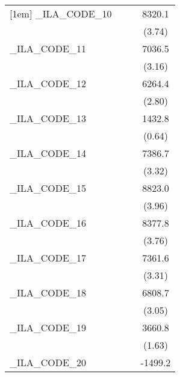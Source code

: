 {\begin{tabular}{l*{3}{c}}
[1em]
\_ILA\_CODE\_10&                     &                     &      8320.1\sym{***}\\
            &                     &                     &      (3.74)         \\
[1em]
\_ILA\_CODE\_11&                     &                     &      7036.5\sym{**} \\
            &                     &                     &      (3.16)         \\
[1em]
\_ILA\_CODE\_12&                     &                     &      6264.4\sym{**} \\
            &                     &                     &      (2.80)         \\
[1em]
\_ILA\_CODE\_13&                     &                     &      1432.8         \\
            &                     &                     &      (0.64)         \\
[1em]
\_ILA\_CODE\_14&                     &                     &      7386.7\sym{***}\\
            &                     &                     &      (3.32)         \\
[1em]
\_ILA\_CODE\_15&                     &                     &      8823.0\sym{***}\\
            &                     &                     &      (3.96)         \\
[1em]
\_ILA\_CODE\_16&                     &                     &      8377.8\sym{***}\\
            &                     &                     &      (3.76)         \\
[1em]
\_ILA\_CODE\_17&                     &                     &      7361.6\sym{***}\\
            &                     &                     &      (3.31)         \\
[1em]
\_ILA\_CODE\_18&                     &                     &      6808.7\sym{**} \\
            &                     &                     &      (3.05)         \\
[1em]
\_ILA\_CODE\_19&                     &                     &      3660.8         \\
            &                     &                     &      (1.63)         \\
[1em]
\_ILA\_CODE\_20&                     &                     &     -1499.2         \\

\end{tabular}}

